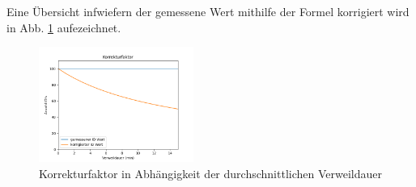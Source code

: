 \documentclass[conference]{IEEEtran}
\begin{document}
Eine Übersicht infwiefern der gemessene Wert mithilfe der Formel korrigiert wird in Abb. \ref{cor_factor} aufezeichnet. \\
\begin{figure}[h]
	\centering
	\includegraphics[width=0.45\textwidth]{"Korrekturfaktor"}
	\caption{Korrekturfaktor in Abhängigkeit der durchschnittlichen Verweildauer}
	\label{cor_factor}
\end{figure} \\
\end{document}
